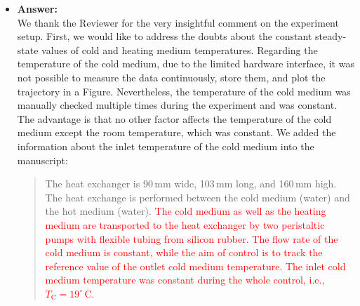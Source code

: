 \documentclass[a4paper,10pt]{article}
\newcommand{\change}[1]{\textcolor{red}{#1}}
\newcommand{\answer}[1]{
	\begin{itemize}
		\item[] \textbf{Answer:}\\ #1
	\end{itemize}
}
\begin{document}
	\answer{
		We thank the Reviewer for the very insightful comment on the experiment setup. 
		First, we would like to address the doubts about the constant steady-state values of cold and heating medium temperatures. Regarding the temperature of the cold medium, due to the limited hardware interface, it was not possible to measure the data continuously, store them, and plot the trajectory in a Figure. Nevertheless, the temperature of the cold medium was manually checked multiple times during the experiment and was constant. The advantage is that no other factor affects the temperature of the cold medium except the room temperature, which was constant. We added the information about the inlet temperature of the cold medium into the manuscript:
		
		\begin{quote}
			The heat exchanger is 90\,mm wide, 103\,mm long, and 160\,mm high. The heat exchange is performed between the cold medium (water) and the hot medium (water). \change{The cold medium as well as the heating medium are transported to the heat exchanger by two peristaltic pumps with flexible tubing from silicon rubber. The flow rate of the cold medium is constant, while the aim of control is to track the reference value of the outlet cold medium temperature. The inlet cold medium temperature was constant during the whole control, i.e., $T_\mathrm{C} = 19^{\circ}$\,C.}
		\end{quote}

}
\end{document}
